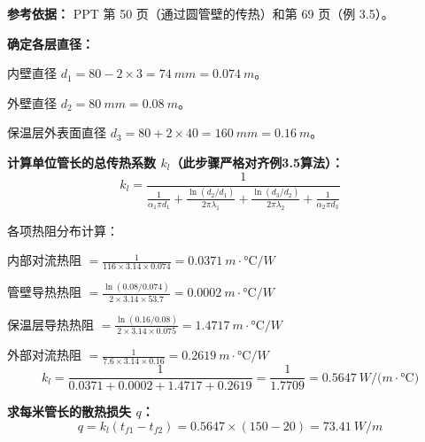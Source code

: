 \begin{solution}
\textbf{参考依据：} PPT 第 50 页（通过圆管壁的传热）和第 69 页（例 3.5）。

\textbf{确定各层直径：}

内壁直径 \(d_1 = 80 - 2 \times 3 = \qty{74}{mm} = \qty{0.074}{m}\)。

外壁直径 \(d_2 = \qty{80}{mm} = \qty{0.08}{m}\)。

保温层外表面直径 \(d_3 = 80 + 2 \times 40 = \qty{160}{mm} = \qty{0.16}{m}\)。

\textbf{计算单位管长的总传热系数 \(k_l\)（此步骤严格对齐例3.5算法）：}
\begin{equation*}
  k_l = \frac{1}{\frac{1}{\alpha_1 \pi d_1} + \frac{\ln(d_2/d_1)}{2\pi\lambda_1} + \frac{\ln(d_3/d_2)}{2\pi\lambda_2} + \frac{1}{\alpha_2 \pi d_3}}
\end{equation*}

各项热阻分布计算：

内部对流热阻 \(= \frac{1}{116 \times 3.14 \times 0.074} = \qty{0.0371}{m\cdot\degreeCelsius/W}\)

管壁导热热阻 \(= \frac{\ln(0.08/0.074)}{2 \times 3.14 \times 53.7} = \qty{0.0002}{m\cdot\degreeCelsius/W}\)

保温层导热热阻 \(= \frac{\ln(0.16/0.08)}{2 \times 3.14 \times 0.075} = \qty{1.4717}{m\cdot\degreeCelsius/W}\)

外部对流热阻 \(= \frac{1}{7.6 \times 3.14 \times 0.16} = \qty{0.2619}{m\cdot\degreeCelsius/W}\)
\begin{equation*}
  k_l = \frac{1}{0.0371 + 0.0002 + 1.4717 + 0.2619} = \frac{1}{1.7709} = \qty{0.5647}{W/(m\cdot\degreeCelsius)}
\end{equation*}

\textbf{求每米管长的散热损失 \(q\)：}
\begin{equation*}
  q = k_l (t_{f1} - t_{f2}) = 0.5647 \times (150 - 20) = \qty{73.41}{W/m}
\end{equation*}
\end{solution}
